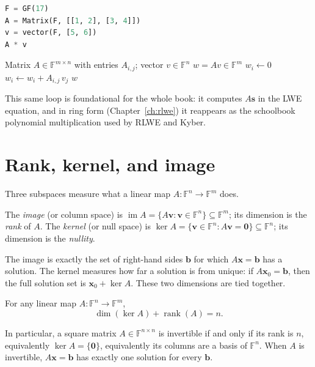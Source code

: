 \begin{lstlisting}[language=Python]
F = GF(17)
A = Matrix(F, [[1, 2], [3, 4]])
v = vector(F, [5, 6])
A * v
\end{lstlisting}

\begin{algorithm}[H]
\caption{Matrix--Vector Product}
\label{alg:matvec}
\begin{algorithmic}[1]
\Require Matrix $A \in \mathbb{F}^{m\times n}$ with entries $A_{i,j}$; vector $v \in \mathbb{F}^n$
\Ensure $w = Av \in \mathbb{F}^m$
    \State $w_i \gets 0$
        \State $w_i \gets w_i + A_{i,j}\, v_j$
    \EndFor
\EndFor
\State \Return $w$
\end{algorithmic}
\end{algorithm}

This same loop is foundational for the whole book: it computes $A\mathbf{s}$ in the LWE equation, and in ring form (Chapter~\ref{ch:rlwe}) it reappears as the schoolbook polynomial multiplication used by RLWE and Kyber.

\section{Rank, kernel, and image}
Three subspaces measure what a linear map $A\colon\mathbb{F}^n\to\mathbb{F}^m$ does.

\begin{definition}
The \emph{image} (or column space) is $\operatorname{im}A = \{A\mathbf{v} : \mathbf{v}\in\mathbb{F}^n\}\subseteq\mathbb{F}^m$; its dimension is the \emph{rank} of $A$. The \emph{kernel} (or null space) is $\ker A = \{\mathbf{v}\in\mathbb{F}^n : A\mathbf{v}=\mathbf{0}\}\subseteq\mathbb{F}^n$; its dimension is the \emph{nullity}.
\end{definition}

The image is exactly the set of right-hand sides $\mathbf{b}$ for which $A\mathbf{x}=\mathbf{b}$ has a solution. The kernel measures how far a solution is from unique: if $A\mathbf{x}_0=\mathbf{b}$, then the full solution set is $\mathbf{x}_0 + \ker A$. These two dimensions are tied together.

\begin{theorem}
For any linear map $A\colon \mathbb{F}^n \to \mathbb{F}^m$,
\[
\dim(\ker A) + \operatorname{rank}(A) = n.
\]
\end{theorem}

In particular, a square matrix $A\in\mathbb{F}^{n\times n}$ is invertible if and only if its rank is $n$, equivalently $\ker A=\{\mathbf{0}\}$, equivalently its columns are a basis of $\mathbb{F}^n$. When $A$ is invertible, $A\mathbf{x}=\mathbf{b}$ has exactly one solution for every $\mathbf{b}$.

